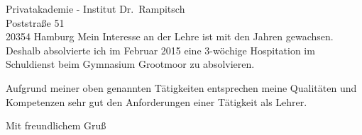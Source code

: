 \documentclass[ebner,paper=a4,fontsize=11pt,ngerman,BCOR=10mm]{scrlttr2}%
\begin{document}
\begin{letter}{Privatakademie - Institut Dr.~Rampitsch\\
Poststra{\ss}e 51\\ 
20354 Hamburg}
Mein Interesse an der Lehre ist mit den Jahren gewachsen. Deshalb absolvierte
ich im Februar 2015 eine 3-w{\"o}chige Hospitation im Schuldienst beim
Gymnasium Grootmoor zu absolvieren.


%

Aufgrund meiner oben genannten T{\"a}tigkeiten entsprechen meine Qualit{\"a}ten und
Kompetenzen sehr gut den Anforderungen einer T{\"a}tigkeit als Lehrer. 


\closing{Mit freundlichem Gru\ss}
\enlargethispage{6\baselineskip}

\end{letter}
\end{document}
